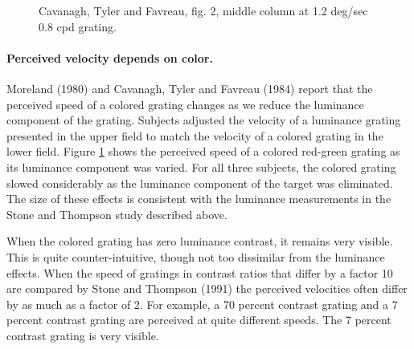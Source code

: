 
\begin{figure}
\centerline{
}
\caption[Speed depends on color]{
Cavanagh, Tyler and Favreau, fig. 2, middle column
at 1.2 deg/sec 0.8 cpd grating.
}
\label{f9:speedColor}
\end{figure}
\paragraph{Perceived velocity depends on color.}
Moreland (1980) and Cavanagh, Tyler and Favreau (1984)
report that the perceived speed of a colored grating
changes as we reduce the luminance component of the
grating.
Subjects adjusted the velocity of a luminance grating
presented in the upper field to match the velocity
of a colored grating in the lower field.
Figure \ref{f9:speedColor} shows the perceived speed of
a colored red-green grating as its luminance component 
was varied.
For all three subjects, the colored grating slowed 
considerably as the luminance component of the target
was eliminated.
The size of these effects is consistent with the luminance
measurements in the Stone and Thompson study described above.

When the colored grating has zero luminance contrast,
it remains very visible.
This is quite counter-intuitive, though not too dissimilar
from the luminance effects.
When the speed of gratings in contrast ratios
that differ by a factor 10 are compared 
by Stone and Thompson (1991) the perceived velocities
often differ by as much as a factor of 2.
For example, a 70 percent contrast grating and a 7 percent
contrast grating are perceived at quite different
speeds.
The 7 percent contrast grating is very visible.

